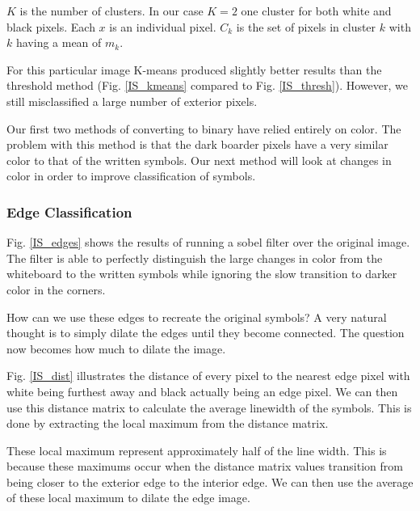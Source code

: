 
$K$ is the number of clusters. In our case $K=2$ one cluster for both white and black pixels. Each $x$ is an individual pixel. $C_k$ is the set of pixels in cluster $k$ with $k$ having a mean of $m_k$.


For this particular image K-means produced slightly better results than the threshold method (Fig. \ref{IS_kmeans} compared to Fig. \ref{IS_thresh}). However, we still misclassified a large number of exterior pixels. 

Our first two methods of converting to binary have relied entirely on color. The problem with this method is that the dark boarder pixels have a very similar color to that of the written symbols. Our next method will look at changes in color in order to improve classification of symbols.

\subsubsection{Edge Classification}

Fig. \ref{IS_edges} shows the results of running a sobel filter over the original image. The filter is able to perfectly distinguish the large changes in color from the whiteboard to the written symbols while ignoring the slow transition to darker color in the corners. 

How can we use these edges to recreate the original symbols? A very natural thought is to simply dilate the edges until they become connected. The question now becomes how much to dilate the image.


Fig. \ref{IS_dist} illustrates the distance of every pixel to the nearest edge pixel with white being furthest away and black actually being an edge pixel. We can then use this distance matrix to calculate the average linewidth of the symbols. This is done by extracting the local maximum from the distance matrix. 


These local maximum represent approximately half of the line width. This is because these maximums occur when the distance matrix values transition from being closer to the exterior edge to the interior edge. We can then use the average of these local maximum to dilate the edge image.  

